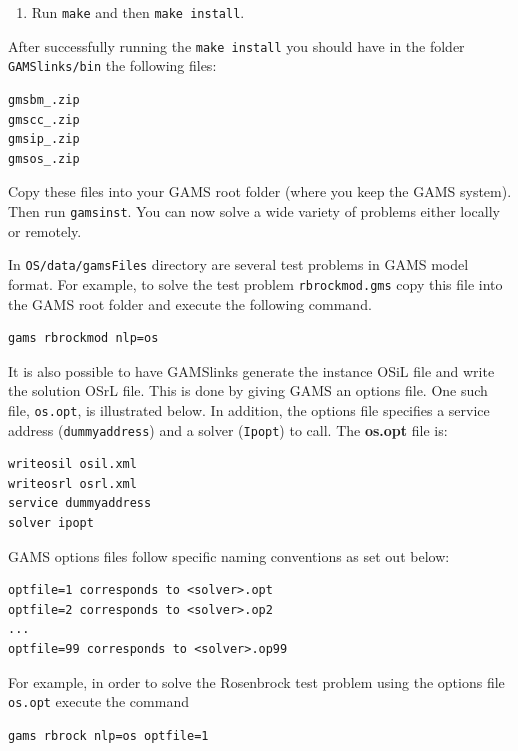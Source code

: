 \documentclass[11pt]{article}
\renewcommand{\_}{{\char"5F}}
\renewcommand{\{}{{\char"7B}}
\renewcommand{\}}{{\char"7D}}
\renewcommand{\^}{{\char"0D}}
\renewcommand{\'}{{\char"0D}}
\begin{document}
\begin{enumerate}[Step 1:]
\begin{enumerate}[1.]
\item Run {\tt make}  and then {\tt make install}. 


\end{enumerate}

After successfully running the {\tt make install} you should have in the folder {\tt GAMSlinks/bin} the following files:
\begin{verbatim}
gmsbm_.zip
gmscc_.zip
gmsip_.zip
gmsos_.zip
\end{verbatim}

Copy these  files into your GAMS root folder (where you keep the GAMS system).  Then run {\tt gamsinst}.   You can now solve  a wide variety of  problems either locally or remotely. 


In {\tt OS/data/gamsFiles} directory are several test problems in GAMS model format. 
 For example, to solve the test problem {\tt rbrockmod.gms} copy this file into the GAMS root folder and execute the following command.

\begin{verbatim}
gams rbrockmod nlp=os
\end{verbatim}

It is also possible to have GAMSlinks generate the instance OSiL file and write the solution  OSrL file.  
This is done by giving GAMS an options file. One such file, {\tt os.opt}, is illustrated below. In addition, 
the options file specifies a service address ({\tt dummyaddress}) and a solver ({\tt Ipopt}) to call.   
The {\bf os.opt} file is:

\begin{verbatim}
writeosil osil.xml
writeosrl osrl.xml
service dummyaddress
solver ipopt
\end{verbatim}

GAMS options files follow specific naming conventions as set out below:

\begin{verbatim}
optfile=1 corresponds to <solver>.opt
optfile=2 corresponds to <solver>.op2
...
optfile=99 corresponds to <solver>.op99
\end{verbatim}

For example, in order to solve the Rosenbrock test problem using the  options file  {\tt os.opt}
execute the command

\begin{verbatim}
gams rbrock nlp=os optfile=1
\end{verbatim}



\end{enumerate}
\end{document}
